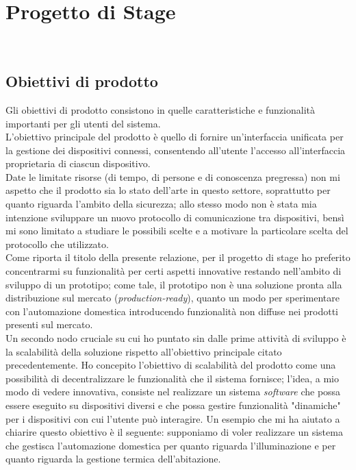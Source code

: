 
\pagebreak
\chapter{Progetto di Stage}
\label{cap:processi-metodologie}

\\

\section{Obiettivi di prodotto}

Gli obiettivi di prodotto consistono in quelle caratteristiche e funzionalità importanti per gli utenti del sistema. \\

L'obiettivo principale del prodotto è quello di fornire un'interfaccia unificata per la gestione dei dispositivi connessi, consentendo all'utente l'accesso all'interfaccia proprietaria di ciascun dispositivo. \\
Date le limitate risorse (di tempo, di persone e di conoscenza pregressa) non mi aspetto che il prodotto sia lo stato dell'arte in questo settore, soprattutto per quanto riguarda l'ambito della sicurezza; allo stesso modo non è stata mia intenzione sviluppare un nuovo protocollo di comunicazione tra dispositivi, bensì mi sono limitato a studiare le possibili scelte e a motivare la particolare scelta del protocollo che utilizzato. \\

Come riporta il titolo della presente relazione, per il progetto di stage ho preferito concentrarmi su funzionalità per certi aspetti innovative restando nell'ambito di sviluppo di un prototipo; come tale, il prototipo non è una soluzione pronta alla distribuzione sul mercato (\emph{production-ready}), quanto un modo per sperimentare con l'automazione domestica introducendo funzionalità non diffuse nei prodotti presenti sul mercato. \\

Un secondo nodo cruciale su cui ho puntato sin dalle prime attività di sviluppo è la scalabilità della soluzione rispetto all'obiettivo principale citato precedentemente.
Ho concepito l'obiettivo di scalabilità del prodotto come una possibilità di decentralizzare le funzionalità che il sistema fornisce; l'idea, a mio modo di vedere innovativa, consiste nel realizzare un sistema \emph{software} che possa essere eseguito su dispositivi diversi e che possa gestire funzionalità "dinamiche" per i dispositivi con cui l'utente può interagire.
Un esempio che mi ha aiutato a chiarire questo obiettivo è il seguente: supponiamo di voler realizzare un sistema che gestisca l'automazione domestica per quanto riguarda l'illuminazione e per quanto riguarda la gestione termica dell'abitazione.

